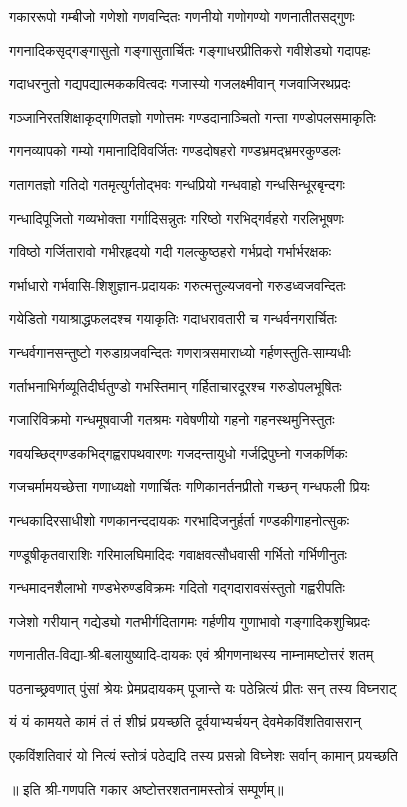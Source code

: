

\twolineshloka
{गकाररूपो गम्बीजो गणेशो गणवन्दितः}
{गणनीयो गणोगण्यो गणनातीतसद्गुणः}%

\twolineshloka
{गगनादिकसृद्गङ्गासुतो गङ्गासुतार्चितः}
{गङ्गाधरप्रीतिकरो गवीशेड्यो गदापहः}%

\twolineshloka
{गदाधरनुतो गद्यपद्यात्मककवित्वदः}
{गजास्यो गजलक्ष्मीवान् गजवाजिरथप्रदः}%

\twolineshloka
{गञ्जानिरतशिक्षाकृद्गणितज्ञो गणोत्तमः}
{गण्डदानाञ्चितो गन्ता गण्डोपलसमाकृतिः}%

\twolineshloka
{गगनव्यापको गम्यो गमानादिविवर्जितः}
{गण्डदोषहरो गण्डभ्रमद्भ्रमरकुण्डलः}%

\twolineshloka
{गतागतज्ञो गतिदो गतमृत्युर्गतोद्भवः}
{गन्धप्रियो गन्धवाहो गन्धसिन्धूरबृन्दगः}%

\twolineshloka
{गन्धादिपूजितो गव्यभोक्ता गर्गादिसन्नुतः}
{गरिष्ठो गरभिद्गर्वहरो गरलिभूषणः}%

\twolineshloka
{गविष्ठो गर्जितारावो गभीरहृदयो गदी}
{गलत्कुष्ठहरो गर्भप्रदो गर्भार्भरक्षकः}%

\twolineshloka
{गर्भाधारो गर्भवासि-शिशुज्ञान-प्रदायकः}
{गरुत्मत्तुल्यजवनो गरुडध्वजवन्दितः}%

\twolineshloka
{गयेडितो गयाश्राद्धफलदश्च गयाकृतिः}
{गदाधरावतारी च गन्धर्वनगरार्चितः}%

\twolineshloka
{गन्धर्वगानसन्तुष्टो गरुडाग्रजवन्दितः}
{गणरात्रसमाराध्यो गर्हणस्तुति-साम्यधीः}%

\twolineshloka
{गर्ताभनाभिर्गव्यूतिदीर्घतुण्डो गभस्तिमान्}
{गर्हिताचारदूरश्च गरुडोपलभूषितः}%

\twolineshloka
{गजारिविक्रमो गन्धमूषवाजी गतश्रमः}
{गवेषणीयो गहनो गहनस्थमुनिस्तुतः}%

\twolineshloka
{गवयच्छिद्गण्डकभिद्गह्वरापथवारणः}
{गजदन्तायुधो गर्जद्रिपुघ्नो गजकर्णिकः}%

\twolineshloka
{गजचर्मामयच्छेत्ता गणाध्यक्षो गणार्चितः}%
{गणिकानर्तनप्रीतो गच्छन् गन्धफली प्रियः}%

\twolineshloka
{गन्धकादिरसाधीशो गणकानन्ददायकः}%
{गरभादिजनुर्हर्ता गण्डकीगाहनोत्सुकः}%

\twolineshloka
{गण्डूषीकृतवाराशिः गरिमालघिमादिदः}%
{गवाक्षवत्सौधवासी गर्भितो गर्भिणीनुतः}%

\twolineshloka
{गन्धमादनशैलाभो गण्डभेरुण्डविक्रमः}%
{गदितो गद्गदारावसंस्तुतो गह्वरीपतिः}%

\twolineshloka
{गजेशो गरीयान् गद्येड्यो गतभीर्गदितागमः}%
{गर्हणीय गुणाभावो गङ्गादिकशुचिप्रदः}%

\twolineshloka
{गणनातीत-विद्या-श्री-बलायुष्यादि-दायकः}%
{एवं श्रीगणनाथस्य नाम्नामष्टोत्तरं शतम्}%

\twolineshloka
{पठनाच्छ्रवणात् पुंसां श्रेयः प्रेमप्रदायकम्}%
{पूजान्ते यः पठेन्नित्यं प्रीतः सन् तस्य विघ्नराट्}%

\twolineshloka
{यं यं कामयते कामं तं तं शीघ्रं प्रयच्छति}%
{दूर्वयाभ्यर्चयन् देवमेकविंशतिवासरान्}%

\twolineshloka
{एकविंशतिवारं यो नित्यं स्तोत्रं पठेद्यदि}%
{तस्य प्रसन्नो विघ्नेशः सर्वान् कामान् प्रयच्छति}%

॥ इति श्री-गणपति गकार अष्टोत्तरशतनामस्तोत्रं सम्पूर्णम्॥
